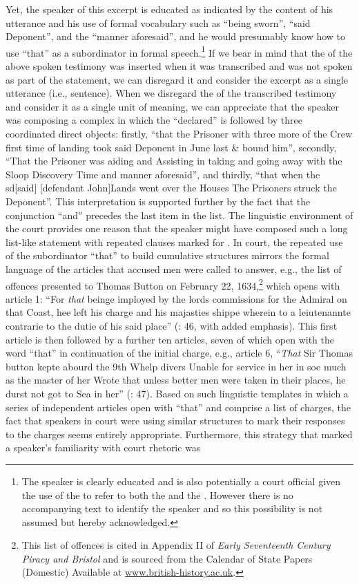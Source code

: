 Yet, the speaker of this excerpt is educated as indicated by the content of his utterance and his use of formal vocabulary such as “being sworn”, “said Deponent”, and the “manner aforesaid”, and he would presumably know how to use “that” as a subordinator in formal speech.\footnote{The speaker is clearly educated and is also potentially a court official given the use of the  to refer to both the  and the . However there is no accompanying text to identify the speaker and so this possibility is not assumed but hereby acknowledged.} If we bear in mind that the  of the above spoken testimony was inserted when it was transcribed and was not spoken as part of the statement, we can disregard it and consider the excerpt as a single utterance (i.e., sentence). When we disregard the  of the transcribed testimony and consider it as a single unit of meaning, we can appreciate that the speaker was composing a complex  in which the  “declared” is followed by three coordinated direct objects: firstly, “that the Prisoner with three more of the Crew first time of landing took said Deponent in June last \& bound him”, secondly, “That the Prisoner was aiding and Assisting in taking and going away with the Sloop Discovery Time and manner aforesaid”, and thirdly, “that when the sd[said] [defendant John]Lands went over the Houses The Prisoners struck the Deponent”. This interpretation is supported further by the fact that the conjunction “and” precedes the last item in the list. The linguistic environment of the court provides one reason that the speaker might have composed such a long list-like statement with repeated clauses marked for . In court, the repeated use of the subordinator “that” to build cumulative structures mirrors the formal language of the articles that accused men were called to answer, e.g., the list of offences presented to Thomas Button on February 22, 1634,\footnote{This list of offences is cited in Appendix II of \textit{Early Seventeenth Century Piracy and Bristol} \citep[46–48]{Hill2013} and is sourced from the Calendar of State Papers (Domestic) Available at \href{http://www.british-history.ac.uk/}{{www.british-history.ac.uk}}.} which opens with article 1: “For \textit{that} beinge imployed by the lords commissions for the Admiral on that Coast, hee left his charge and his majasties shippe wherein to a leiutenannte contrarie to the dutie of his said place” (\citealt{Hill2013}: 46, with added emphasis). This first article is then followed by a further ten articles, seven of which open with the word “that” in continuation of the initial charge, e.g., article 6, “\textit{That} Sir Thomas button kepte abourd the 9th Whelp divers Unable for service in her in soe much as the master of her Wrote that unless better men were taken in their places, he durst not got to Sea in her” (\citealt{Hill2013}: 47). Based on such linguistic templates in which a series of independent articles open with “that” and comprise a list of charges, the fact that speakers in court were using similar structures to mark their responses to the charges seems entirely appropriate. Furthermore, this strategy that marked a speaker’s familiarity with court rhetoric was 